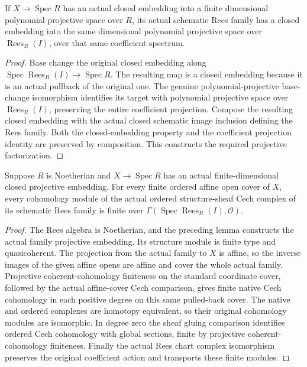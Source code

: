 \begin{lemma}
\label{lem:fc-formal-functions-projective-family}
\leanok
If $X\to\operatorname{Spec}R$ has an actual closed embedding into a finite
dimensional polynomial projective space over $R$, its actual schematic
Rees family has a closed embedding into the same dimensional polynomial
projective space over $\operatorname{Rees}_R(I)$, over that same coefficient
spectrum.
\end{lemma}
\begin{proof}
Base change the original closed embedding along
$\operatorname{Spec}\operatorname{Rees}_R(I)\to\operatorname{Spec}R$.
The resulting map is a closed embedding because it is an actual pullback
of the original one. The genuine polynomial-projective base-change
isomorphism identifies its target with polynomial projective space over
$\operatorname{Rees}_R(I)$, preserving the entire coefficient projection.
Compose the resulting closed embedding with the actual closed schematic
image inclusion defining the Rees family. Both the closed-embedding
property and the coefficient projection identity are preserved by
composition. This constructs the required projective factorization.
\end{proof}

\begin{lemma}
\label{lem:fc-formal-functions-rees-cohomology-finite}
\leanok
Suppose $R$ is Noetherian and $X\to\operatorname{Spec}R$ has an actual
finite-dimensional closed projective embedding. For every finite ordered
affine open cover of $X$, every cohomology module of the actual ordered
structure-sheaf Cech complex of its schematic Rees family is finite over
$\Gamma(\operatorname{Spec}\operatorname{Rees}_R(I),\mathcal O)$.
\end{lemma}
\begin{proof}
The Rees algebra is Noetherian, and the preceding lemma constructs the
actual family projective embedding. Its structure module is finite type
and quasicoherent. The projection from the actual family to $X$ is affine,
so the inverse images of the given affine opens are affine and cover the
whole actual family. Projective coherent-cohomology finiteness on the
standard coordinate cover, followed by the actual affine-cover Cech
comparison, gives finite native Cech cohomology in each positive degree
on this same pulled-back cover. The native and ordered complexes are
homotopy equivalent, so their original cohomology modules are isomorphic.
In degree zero the sheaf gluing comparison identifies ordered Cech
cohomology with global sections, finite by projective coherent-cohomology
finiteness. Finally the actual Rees chart complex isomorphism preserves
the original coefficient action and transports these finite modules.
\end{proof}

